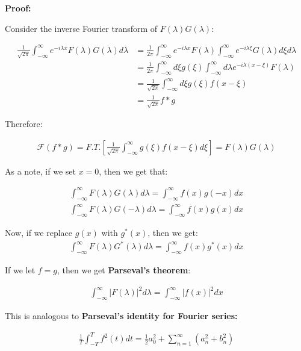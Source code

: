 \documentclass{article}
\theoremstyle{definition}
\def\F{\mathcal{F}}
\begin{document}
\textbf{Proof:}

Consider the inverse Fourier transform of $F(\lambda ) G(\lambda)$:

\begin{align*}
\frac{1}{\sqrt{2 \pi}} \int_{-\infty}^{\infty} e^{- i \lambda x}F(\lambda ) G(\lambda) d\lambda  &= \frac{1}{2 \pi} \int_{-\infty}^{\infty} e^{- i \lambda x}F(\lambda ) \int_{-\infty}^{\infty} e^{- i \lambda \xi}G(\lambda ) d\xi d\lambda  \\ 
& = \frac{1}{2 \pi} \int_{-\infty}^{\infty} d \xi g(\xi) \int_{-\infty}^{\infty} d\lambda e^{- i \lambda (x-\xi)}F(\lambda ) \\ 
& = \frac{1}{\sqrt{2 \pi}} \int_{-\infty}^{\infty} d \xi g(\xi) f(x-\xi) \\
& = \frac{1}{\sqrt{2 \pi}} f * g 
\end{align*}

Therefore:

\begin{align*}
\F (f * g) = F.T. \left[\frac{1}{\sqrt{2 \pi}} \int_{-\infty}^{\infty} g(\xi) f(x-\xi) d\xi\right] = F(\lambda ) G(\lambda)
\end{align*}

As a note, if we set $x=0$, then we get that:

\begin{align*}
 \int_{-\infty}^{\infty} F(\lambda) G(\lambda) d\lambda =  \int_{-\infty}^{\infty} f(x) g(-x)dx \\
  \int_{-\infty}^{\infty} F(\lambda) G(-\lambda) d\lambda =  \int_{-\infty}^{\infty} f(x) g(x)dx 
\end{align*}

Now, if we replace $g(x)$ with $g^* (x)$, then we get:
\begin{align*}
 \int_{-\infty}^{\infty} F(\lambda) G^*(\lambda) d\lambda =  \int_{-\infty}^{\infty} f(x) g^*(x)dx 
\end{align*}

If we let $f = g$, then we get \textbf{Parseval's theorem}:

\begin{align*}
 \int_{-\infty}^{\infty} |F(\lambda)|^2 d\lambda =  \int_{-\infty}^{\infty} |f(x)|^2dx 
\end{align*}

This is analogous to \textbf{Parseval's identity for Fourier series:}

\begin{align*}
\frac{1}{T} \int_{-T}^{T} f^2(t) dt = \frac{1}{2} a_0^2  + \sum_{n=1}^\infty (a_n^2 + b_n^2)
\end{align*}
\end{document}
